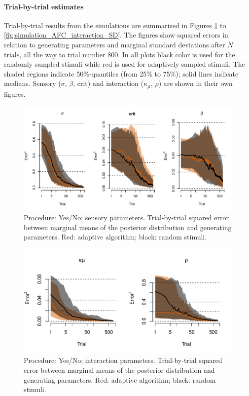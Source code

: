 \documentclass{article}\usepackage{knitr}
\begin{document}
\paragraph{Trial-by-trial estimates}
Trial-by-trial results from the simulations are summarized in Figures \ref{fig:simulation_YN_sensory_sq_error} to \ref{fig:simulation_AFC_interaction_SD}. The figures show squared errors in relation to generating parameters and marginal standard deviations after $N$ trials, all the way to trial number 800. In all plots black color is used for the randomly sampled stimuli while red is used for adaptively sampled stimuli. The shaded regions indicate 50\%-quantiles (from 25\% to 75\%); solid lines indicate medians. Sensory ($\sigma$, $\beta$, crit) and interaction ($\kappa_{\mu}$, $\rho$) are shown in their own figures.

\begin{figure}[H]
\centering
\includegraphics[scale=0.75, angle = 0]{simulation_YN_sensory_sq_error}
\caption{Procedure: Yes/No; sensory parameters. Trial-by-trial squared error between marginal means of the posterior distribution and generating parameters. Red: adaptive algorithm; black: random stimuli.}
\label{fig:simulation_YN_sensory_sq_error}
\end{figure}

\begin{figure}[H]
\centering
\includegraphics[scale=0.75, angle = 0]{simulation_YN_interaction_sq_error}
\caption{Procedure: Yes/No; interaction parameters. Trial-by-trial squared error between marginal means of the posterior distribution and generating parameters. Red: adaptive algorithm; black: random stimuli.}
\label{fig:simulation_YN_interaction_sq_error}
\end{figure}
\end{document}
